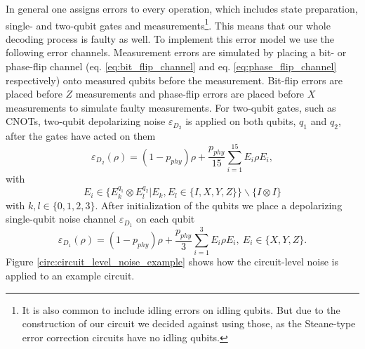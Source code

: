 In general one assigns errors to every operation, which includes state preparation, single- and two-qubit gates and measurements\footnote{
It is also common to include idling errors on idling qubits.
But due to the construction of our circuit we decided against using those,
as the Steane-type error correction circuits have no idling qubits.
}.
This means that our whole decoding process is faulty as well.
To implement this error model we use the following error channels.
Measurement errors are simulated by placing a bit- or phase-flip channel (eq. \eqref{eq:bit_flip_channel} and eq. \eqref{eq:phase_flip_channel} respectively) onto measured qubits before the measurement.
Bit-flip errors are placed before $Z$ measurements and phase-flip errors are placed before $X$ measurements to simulate faulty measurements.
For two-qubit gates, such as CNOTs, two-qubit depolarizing noise $\varepsilon_{D_2}$ is applied on both qubits, $q_1$ and $q_2$, after the gates have acted on them 
\begin{equation}
    \varepsilon_{D_2}(\rho) = (1-p_{phy}) \rho + \frac{p_{phy}}{15} \sum_{i=1}^{15} E_i \rho E_i,
    \label{eq:depo_2_noise}
\end{equation}
with
\begin{equation}
    E_i \in \{E_{k}^{q_1} \otimes E_{l}^{q_2} | E_k,E_l \in \{I,X,Y,Z\} \} \backslash \{I\otimes I \}
\end{equation}
with $ k,l \in  \{0,1,2,3\}$.
After initialization of the qubits we place a depolarizing single-qubit noise channel $\varepsilon_{D_1}$ on each qubit
\begin{equation}
    \varepsilon_{D_1}(\rho) = (1-p_{phy}) \rho + \frac{p_{phy}}{3} \sum^3_{i=1} E_i \rho E_i,\  E_i \in \{ X, Y, Z \}.
    \label{eq:depo_1_noise}
\end{equation}
Figure \ref{circ:circuit_level_noise_example} shows how the circuit-level noise is applied to an example circuit. 

